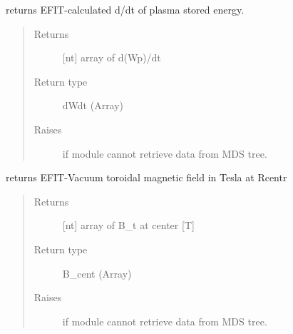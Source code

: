 \documentclass[letterpaper,10pt,english]{sphinxmanual}
\begin{document}
\begin{fulllineitems}

\begin{fulllineitems}
\label{\detokenize{eqtools:eqtools.EFIT.EFITTree.getWpdot}}
returns EFIT-calculated d/dt of plasma stored energy.
\begin{quote}\begin{description}
\item[{Returns}] \leavevmode
{[}nt{]} array of d(Wp)/dt

\item[{Return type}] \leavevmode
dWdt (Array)

\item[{Raises}] \leavevmode
{} \textendash{} if module cannot retrieve data from MDS tree.

\end{description}\end{quote}

\end{fulllineitems}


\begin{fulllineitems}
\label{\detokenize{eqtools:eqtools.EFIT.EFITTree.getBCentr}}
returns EFIT-Vacuum toroidal magnetic field in Tesla at Rcentr
\begin{quote}\begin{description}
\item[{Returns}] \leavevmode
{[}nt{]} array of B\_t at center {[}T{]}

\item[{Return type}] \leavevmode
B\_cent (Array)

\item[{Raises}] \leavevmode
{} \textendash{} if module cannot retrieve data from MDS tree.

\end{description}\end{quote}

\end{fulllineitems}



\end{fulllineitems}
\end{document}
